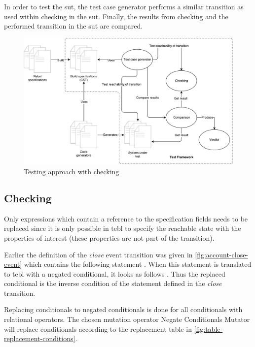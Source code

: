 In order to test the \gls{sut}, the test case generator performs a similar transition
as used within checking in the \gls{sut}. Finally, the results from checking and the
performed transition in the \gls{sut} are compared.

\begin{figure}[h!]
  \centering
  \includegraphics[width=\linewidth{}]{figures/mutated-checking-diagram.pdf}
  \caption{Testing approach with checking}\label{fig:mutated-checking}
\end{figure}
\FloatBarrier

\subsection{Checking}
Only expressions which contain a reference to the specification fields needs to
be replaced since it is only possible in tebl to specify the reachable state
with the properties of interest (these properties are not part of the
transition).

Earlier the definition of the \textit{close} event transition was given in
\autoref{fig:account-close-event} which contains the following statement
. When this statement is translated to tebl
with a negated conditional, it looks as follows
. Thus the replaced conditional is the inverse
condition of the statement defined in the \textit{close} transition.

Replacing conditionals to negated conditionals is done for all conditionals with
relational operators. The chosen mutation operator Negate Conditionals Mutator
will replace conditionals according to the replacement table in
\autoref{fig:table-replacement-conditions}.


